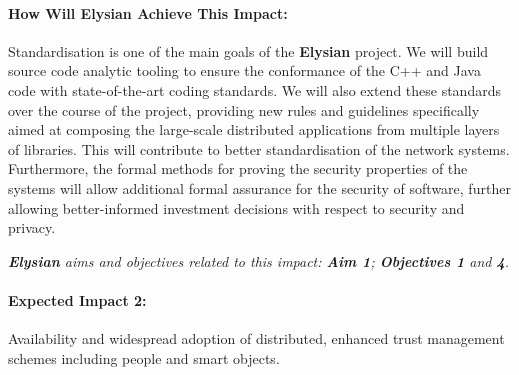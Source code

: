 \documentclass[a4paper,11pt]{article}
\newcommand{\project}[1]{\textbf{#1}\xspace}
\newcommand{\SECURITY}{\project{Elysian}}
\newcommand{\TheProject}{\SECURITY}
\begin{document}
\begin{mdframed}[backgroundcolor=gray!10]
\paragraph{How Will \TheProject{} Achieve This Impact:}
Standardisation is one of the main goals of the \TheProject{} project. We will build source code analytic tooling to ensure the conformance of the C++ and Java code with state-of-the-art coding standards. We will also extend these standards over the course of the project, providing new rules and guidelines specifically aimed at composing the large-scale distributed applications from multiple layers of libraries. This will contribute to better standardisation of the network systems. Furthermore, the formal methods for proving the security properties of the systems will allow additional formal assurance for the security of software, further allowing better-informed investment decisions with respect to security and privacy.

\emph{\TheProject{} aims and objectives related to this impact: \textbf{Aim 1}; \textbf{Objectives 1} and \textbf{4}.}

\end{mdframed}

\begin{mdframed}[backgroundcolor=blue!5]
\paragraph{Expected Impact 2:}
Availability and widespread adoption of distributed, enhanced trust management schemes including people and smart objects.
\end{mdframed}
\end{document}
